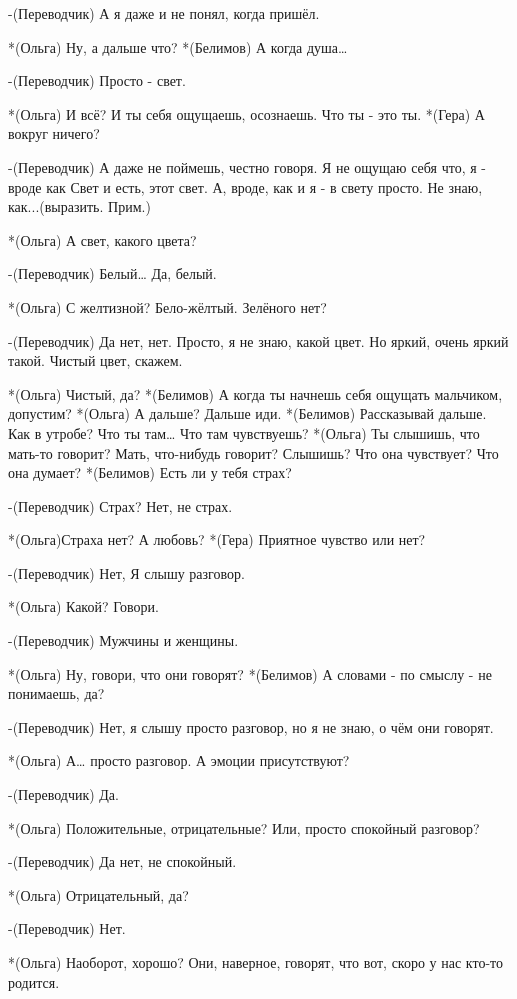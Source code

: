 -(Переводчик) А я даже и не понял, когда пришёл.

*(Ольга) Ну, а дальше что?
*(Белимов) А когда душа…

-(Переводчик) Просто - свет.

*(Ольга) И всё? И ты себя ощущаешь, осознаешь. Что ты - это ты.
*(Гера) А вокруг ничего?

-(Переводчик) А даже не поймешь, честно говоря. Я не ощущаю себя что, я - вроде как Свет и есть, этот свет. А, вроде, как и я - в свету просто. Не знаю, как...(выразить. Прим.)

*(Ольга) А свет, какого цвета?

-(Переводчик) Белый… Да, белый.

*(Ольга) С желтизной? Бело-жёлтый. Зелёного нет?

-(Переводчик) Да нет, нет. Просто, я  не знаю, какой цвет. Но яркий, очень яркий такой. Чистый цвет, скажем.

*(Ольга) Чистый, да?
*(Белимов) А когда ты начнешь себя ощущать мальчиком, допустим?
*(Ольга) А дальше? Дальше иди.
*(Белимов) Рассказывай дальше. Как в утробе?  Что ты там… Что там чувствуешь?
*(Ольга) Ты слышишь, что мать-то говорит? Мать, что-нибудь говорит? Слышишь? Что она чувствует? Что она думает?
*(Белимов) Есть ли у тебя страх?

-(Переводчик) Страх? Нет, не страх.

*(Ольга)Страха нет? А любовь? 
*(Гера) Приятное чувство или нет?

-(Переводчик) Нет, Я слышу разговор.

*(Ольга) Какой? Говори.

-(Переводчик) Мужчины и женщины.

*(Ольга) Ну, говори, что они говорят?
*(Белимов) А словами - по смыслу - не понимаешь, да?

-(Переводчик) Нет, я слышу просто разговор, но я не знаю, о чём они говорят.

*(Ольга) А… просто разговор. А эмоции присутствуют?

-(Переводчик) Да.

*(Ольга) Положительные, отрицательные? Или, просто спокойный разговор?

-(Переводчик) Да нет, не спокойный.

*(Ольга) Отрицательный, да?

-(Переводчик) Нет.

*(Ольга) Наоборот, хорошо? Они, наверное, говорят, что вот, скоро у нас кто-то родится.

